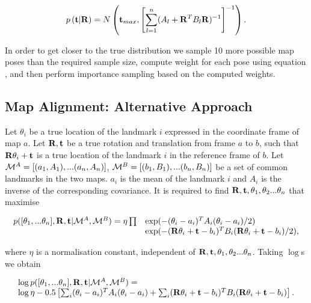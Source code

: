 \begin{equation}
 p \left( {\bf t}|{\bf R} \right) = N \left({\bf t}_{max},\left[ \sum_{l=1}^{n}( A_l + {\bf R}^TB_l{\bf R})^{-1}
  \right] ^{-1} \right).
\end{equation}

In order to get closer to the true distribution we sample 10 more
possible map poses than the required sample size, compute weight for
each pose using equation ,
and then perform importance sampling based on the computed weights.


\subsection{Map Alignment: Alternative Approach}


Let $\theta_i$ be a true location of the landmark $i$ expressed in the
coordinate frame of map $a$. Let ${\bf R,t}$ be a true rotation and
translation from frame $a$ to $b$, such that ${\bf R}\theta_i + {\bf
t}$ is a true location of the landmark $i$ in the reference frame of
$b$. Let $\mapA=[(a_1,A_1),...(a_n,A_n)]$,
$\mapB=[(b_1,B_1),...(b_n,B_n)]$ be a set of common landmarks in the
two maps. $a_i$ is the mean of the landmark $i$ and $A_i$ is the
inverse of the corresponding covariance. It is required to find ${\bf
R,t},\theta_1, \theta_2 ...\theta_n$ that maximise

\begin{equation}
\begin{array}{ll}
p([\theta_1, ...\theta_n],{\bf R},{\bf t} | \mapA, \mapB) =
 \eta \prod& \exp(-(\theta_i - a_i)^T A_i (\theta_i - a_i)/2)\\
&\exp(-({\bf R}\theta_i + {\bf t} - b_i)^T B_i
({\bf R}\theta_i + {\bf t} - b_i)/2),
\label{eqn:align_w0}
\end{array}
\end{equation}


where $\eta$ is a normalisation constant, independent of ${\bf
R,t},\theta_1, \theta_2 ...\theta_n$. Taking $\log$s we obtain

\begin{equation}
\begin{array}{l}
\log p([\theta_1, ...\theta_n],{\bf R},{\bf t} | \mapA, \mapB) =\\
\log\eta - 0.5 \left[
\sum_i (\theta_i - a_i)^T A_i (\theta_i - a_i) +
\sum_i ({\bf R}\theta_i + {\bf t} - b_i)^T B_i({\bf R}\theta_i + {\bf t} - b_i)
\right].
\end{array}
\label{eqn:align_log_prob}
\end{equation}

